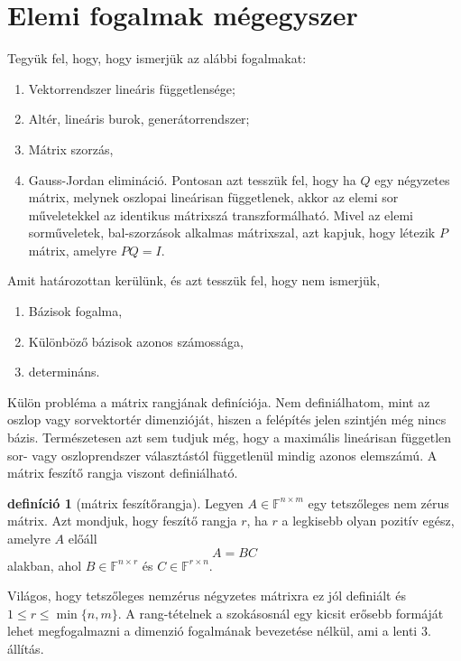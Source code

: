 \documentclass[9pt, a4paper, showtrims]{memoir}
\theoremstyle{plain}
\theoremstyle{remark}
\theoremstyle{definition}
\newtheorem{definition}[proposition]{definíció}
\begin{document}
\chapter*{Elemi fogalmak mégegyszer}
Tegyük fel, hogy, hogy ismerjük az alábbi fogalmakat:
\begin{enumerate}
    \item Vektorrendszer lineáris függetlensége;
    \item Altér, lineáris burok, generátorrendszer;
    \item Mátrix szorzás,
    \item Gauss-Jordan elimináció.  Pontosan azt tesszük fel, hogy ha $Q$ egy négyzetes mátrix, melynek oszlopai
        lineárisan függetlenek, akkor az elemi sor műveletekkel az identikus mátrixszá transzformálható.
        Mivel az elemi sorműveletek, bal-szorzások alkalmas mátrixszal, 
        azt kapjuk, hogy létezik $P$ mátrix, amelyre $PQ=I$.
\end{enumerate}
Amit határozottan kerülünk, és azt tesszük fel, hogy nem ismerjük,
\begin{enumerate}
    \item Bázisok fogalma,
    \item Különböző bázisok azonos számossága,
    \item determináns.
\end{enumerate}
Külön probléma a mátrix rangjának definíciója.
Nem definiálhatom, 
mint az oszlop vagy sorvektortér dimenzióját, hiszen a felépítés jelen szintjén még nincs bázis.
Természetesen azt sem tudjuk még, hogy a maximális lineárisan független sor- vagy oszloprendszer választástól függetlenül mindig azonos elemszámú.
A mátrix feszítő rangja viszont definiálható.
\begin{definition}[mátrix feszítőrangja]
    Legyen $A\in\mathbb{F}^{n\times m}$ egy tetszőleges nem zérus mátrix.
    Azt mondjuk, hogy feszítő rangja $r$, ha $r$ a legkisebb olyan pozitív egész, amelyre $A$ előáll
    \[
        A=BC
    \]
    alakban, ahol $B\in\mathbb{F}^{n\times r}$ és $C\in\mathbb{F}^{r\times n}$.
\end{definition}
Világos, hogy tetszőleges nemzérus négyzetes mátrixra ez jól definiált és $1\leq r \leq \min\{n,m\}$.
A rang-tételnek a szokásosnál egy kicsit erősebb formáját lehet megfogalmazni a dimenzió fogalmának bevezetése nélkül,
ami a lenti 3. állítás.
\end{document}
